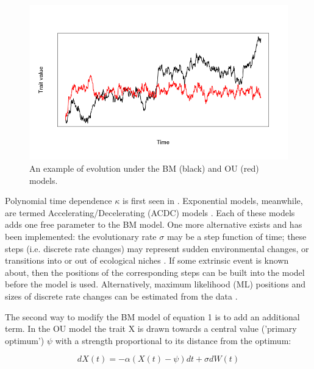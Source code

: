 \documentclass[12pt]{article}
\begin{document}
\begin{figure}[!ht]
	\begin{center}
	\includegraphics[width=6in]{figures/sim}
	\end{center}
	\vspace{-40pt}	
	\caption{
		An example of evolution under the BM (black) and OU (red) models.
	}
	\label{Figure_label}
\end{figure}

Polynomial time dependence $\kappa$ is first seen in \cite{pagel_inferring_1997}.
Exponential models, meanwhile, are termed Accelerating/Decelerating (ACDC) models \citep{blomberg_testing_2003}. 
Each of these models adds one free parameter to the BM model.
One more alternative exists and has been implemented: the evolutionary rate $\sigma$ may be a step function of time; these steps (i.e. discrete rate changes) may represent sudden environmental changes, or transitions into or out of ecological niches \citep{thomas_comparative_2006, o'meara_testing_2006}. 
If some extrinsic event is known about, then the positions of the corresponding steps can be built into the model before the model is used. 
Alternatively, maximum likelihood (ML) positions and sizes of discrete rate changes can be estimated from the data \citep{thomas_motmot:_2012,revell_new_2012}. 

The second way to modify the BM model of equation 1 is to add an additional term. 
In the OU model \citep{hansen_stabilizing_1997} the trait X is drawn towards a central value ('primary optimum') $\psi$ with a strength proportional to its distance from the optimum:

\begin{equation}
	dX(t) = - \alpha (X(t) - \psi) dt + \sigma dW(t)
\end{equation}
\end{document}
